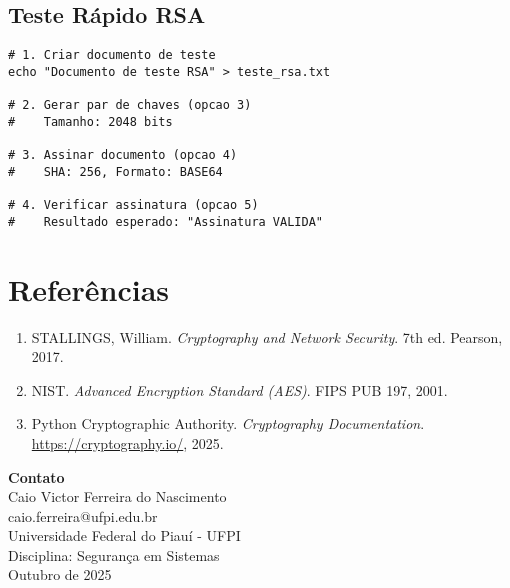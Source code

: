 \documentclass[12pt,a4paper]{article}
\begin{document}
\subsection{Teste Rápido RSA}

\begin{lstlisting}[style=bashstyle]
# 1. Criar documento de teste
echo "Documento de teste RSA" > teste_rsa.txt

# 2. Gerar par de chaves (opcao 3)
#    Tamanho: 2048 bits

# 3. Assinar documento (opcao 4)
#    SHA: 256, Formato: BASE64

# 4. Verificar assinatura (opcao 5)
#    Resultado esperado: "Assinatura VALIDA"
\end{lstlisting}

\section{Referências}

\begin{enumerate}
    \item STALLINGS, William. \textit{Cryptography and Network Security}. 7th ed. Pearson, 2017.
    \item NIST. \textit{Advanced Encryption Standard (AES)}. FIPS PUB 197, 2001.
    \item Python Cryptographic Authority. \textit{Cryptography Documentation}. \url{https://cryptography.io/}, 2025.
\end{enumerate}

\vspace{10mm}

\begin{center}
\begin{tcolorbox}[width=0.85\textwidth,colback=primaryblue!10,colframe=primaryblue]
\textbf{Contato}\\
Caio Victor Ferreira do Nascimento\\
caio.ferreira@ufpi.edu.br\\
Universidade Federal do Piauí - UFPI\\
Disciplina: Segurança em Sistemas\\
Outubro de 2025
\end{tcolorbox}
\end{center}
\end{document}

